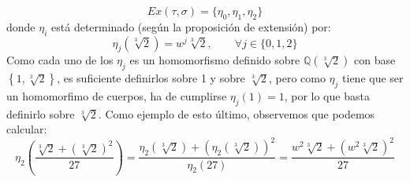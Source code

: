 \begin{ejemplo}
\begin{equation*}
        Ex(\tau,\sigma) = \{\eta_0,\eta_1,\eta_2\}
    \end{equation*}
    donde $\eta_i$ está determinado (según la proposición de extensión) por:
    \begin{equation*}
        \eta_j\left(\sqrt[3]{2}\right) = w^j \sqrt[3]{2}, \qquad \forall j \in \{0,1,2\}
    \end{equation*}
    Como cada uno de los $\eta_j$ es un homomorfismo definido sobre $\mathbb{Q}\left(\sqrt[3]{2}\right)$ con base $\left\{1,\sqrt[3]{2}\right\}$, es suficiente definirlos sobre 1 y sobre $\sqrt[3]{2}$, pero como $\eta_j$ tiene que ser un homomorfimo de cuerpos, ha de cumplirse $\eta_j(1)=1$, por lo que basta definirlo sobre $\sqrt[3]{2}$. Como ejemplo de esto último, observemos que podemos calcular:
    \begin{equation*}
        \eta_2\left(\frac{{\sqrt[3]{2}+\left(\sqrt[3]{2}\right)}^{2}}{27}\right) = \dfrac{\eta_2(\sqrt[3]{2}) + {\left(\eta_2\left(\sqrt[3]{2}\right)\right)}^{2}}{\eta_2(27)} = \dfrac{w^2 \sqrt[3]{2} + {\left(w^2\sqrt[3]{2}\right)}^{2}}{27} 
    \end{equation*} 
\end{ejemplo}

